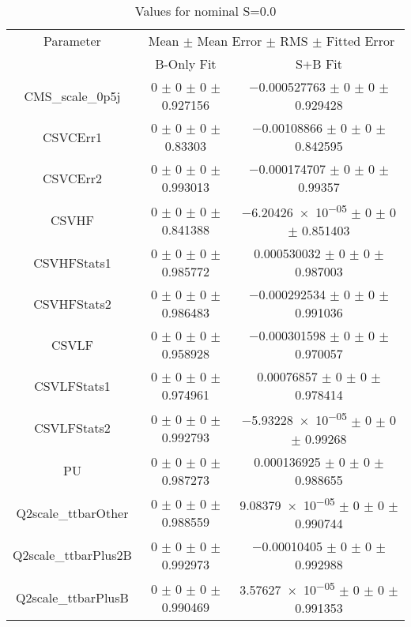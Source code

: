 \begin{table}
\centering
\caption{Values for nominal S=0.0}
\begin{tabular}{ccc}
\toprule
Parameter & \multicolumn{2}{c}{Mean $\pm$ Mean Error $\pm$ RMS $\pm$ Fitted Error}\\
 & B-Only Fit & S+B Fit\\
\midrule
CMS\_scale\_0p5j & \num{0} $\pm$ \num{0} $\pm$ \num{0} $\pm$ \num{0.927156} & \num{-0.000527763} $\pm$ \num{0} $\pm$ \num{0} $\pm$ \num{0.929428}\\
CSVCErr1 & \num{0} $\pm$ \num{0} $\pm$ \num{0} $\pm$ \num{0.83303} & \num{-0.00108866} $\pm$ \num{0} $\pm$ \num{0} $\pm$ \num{0.842595}\\
CSVCErr2 & \num{0} $\pm$ \num{0} $\pm$ \num{0} $\pm$ \num{0.993013} & \num{-0.000174707} $\pm$ \num{0} $\pm$ \num{0} $\pm$ \num{0.99357}\\
CSVHF & \num{0} $\pm$ \num{0} $\pm$ \num{0} $\pm$ \num{0.841388} & \num{-6.20426e-05} $\pm$ \num{0} $\pm$ \num{0} $\pm$ \num{0.851403}\\
CSVHFStats1 & \num{0} $\pm$ \num{0} $\pm$ \num{0} $\pm$ \num{0.985772} & \num{0.000530032} $\pm$ \num{0} $\pm$ \num{0} $\pm$ \num{0.987003}\\
CSVHFStats2 & \num{0} $\pm$ \num{0} $\pm$ \num{0} $\pm$ \num{0.986483} & \num{-0.000292534} $\pm$ \num{0} $\pm$ \num{0} $\pm$ \num{0.991036}\\
CSVLF & \num{0} $\pm$ \num{0} $\pm$ \num{0} $\pm$ \num{0.958928} & \num{-0.000301598} $\pm$ \num{0} $\pm$ \num{0} $\pm$ \num{0.970057}\\
CSVLFStats1 & \num{0} $\pm$ \num{0} $\pm$ \num{0} $\pm$ \num{0.974961} & \num{0.00076857} $\pm$ \num{0} $\pm$ \num{0} $\pm$ \num{0.978414}\\
CSVLFStats2 & \num{0} $\pm$ \num{0} $\pm$ \num{0} $\pm$ \num{0.992793} & \num{-5.93228e-05} $\pm$ \num{0} $\pm$ \num{0} $\pm$ \num{0.99268}\\
PU & \num{0} $\pm$ \num{0} $\pm$ \num{0} $\pm$ \num{0.987273} & \num{0.000136925} $\pm$ \num{0} $\pm$ \num{0} $\pm$ \num{0.988655}\\
Q2scale\_ttbarOther & \num{0} $\pm$ \num{0} $\pm$ \num{0} $\pm$ \num{0.988559} & \num{9.08379e-05} $\pm$ \num{0} $\pm$ \num{0} $\pm$ \num{0.990744}\\
Q2scale\_ttbarPlus2B & \num{0} $\pm$ \num{0} $\pm$ \num{0} $\pm$ \num{0.992973} & \num{-0.00010405} $\pm$ \num{0} $\pm$ \num{0} $\pm$ \num{0.992988}\\
Q2scale\_ttbarPlusB & \num{0} $\pm$ \num{0} $\pm$ \num{0} $\pm$ \num{0.990469} & \num{3.57627e-05} $\pm$ \num{0} $\pm$ \num{0} $\pm$ \num{0.991353}\\

\end{tabular}
\end{table}
